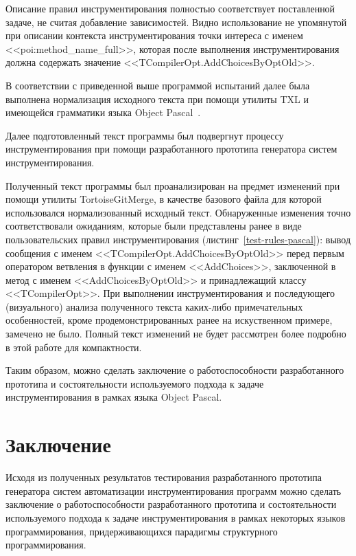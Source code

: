 Описание правил инструментирования полностью соответствует поставленной задаче, не считая добавление зависимостей.
Видно использование не упомянутой при описании контекста инструментирования точки интереса с именем <<poi:method\_name\_full>>, которая после выполнения инструментирования должна содержать значение <<TCompilerOpt.AddChoicesByOptOld>>.

В соответствии с приведенной выше программой испытаний далее была выполнена нормализация исходного текста при помощи утилиты TXL и имеющейся грамматики языка Object Pascal~\cite{txl-resources}.

Далее подготовленный текст программы был подвергнут процессу инструментирования при помощи разработанного прототипа генератора систем инструментирования.

Полученный текст программы был проанализирован на предмет изменений при помощи утилиты TortoiseGitMerge, в качестве базового файла для которой использовался нормализованный исходный текст.
Обнаруженные изменения точно соответствовали ожиданиям, которые были представлены ранее в виде пользовательских правил инструментирования (листинг~\ref{test-rules-pascal}):
вывод сообщения с именем <<TCompilerOpt.AddChoicesByOptOld>> перед первым оператором ветвления в функции с именем <<AddChoices>>, заключенной в метод с именем <<AddChoicesByOptOld>> и принадлежащий классу <<TCompilerOpt>>.
При выполнении инструментирования и последующего (визуального) анализа полученного текста каких-либо примечательных особенностей, кроме продемонстрированных ранее на искуственном примере, замечено не было.
Полный текст изменений не будет рассмотрен более подробно в этой работе для компактности.

Таким образом, можно сделать заключение о работоспособности разработанного прототипа и состоятельности используемого подхода к задаче инструментирования в рамках языка Object Pascal.

\section{Заключение}

Исходя из полученных результатов тестирования разработанного прототипа генератора систем автоматизации инструментирования программ можно сделать заключение о работоспособности разработанного прототипа и состоятельности используемого подхода к задаче инструментирования в рамках некоторых языков программирования, придерживающихся парадигмы структурного программирования.

